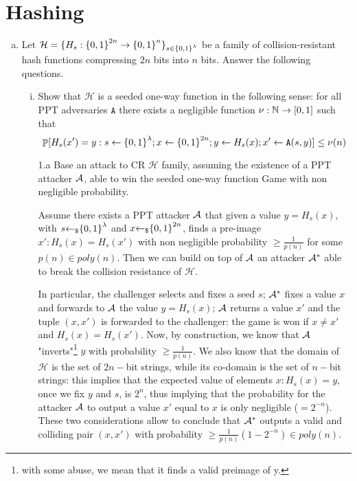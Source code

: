 \section{Hashing}
\begin{enumerate}[(a)]
	\item  Let $\mathcal{H} = \{H_s : {\{0, 1\}}^{2n} \to {\{0, 1\}}^n\}_{s\in{\{0, 1\}}^\lambda}$ be a family of collision-resistant hash
	functions compressing $2n$ bits into $n$ bits. Answer the following questions.
	\begin{enumerate}[(i)]
		\item Show that $\mathcal{H}$ is a seeded one-way function in the following sense: for all PPT adversaries $\texttt{A}$ there exists a negligible function $\nu: {\mathbb N} \to [0, 1]$ such that
		\[\mathop{\mathbb P}[H_s(x') = y: s \leftarrow {\{0, 1\}}^\lambda; x \leftarrow {\{0, 1\}}^{2n}; y \leftarrow H_s(x); x' \leftarrow \texttt{A}(s,y)] \le \nu(n) \]

	\begin{solution}
		\begin{cryptoredux}
			{1.a}
			{Base an attack to CR $\mathcal{H}$ family, assuming the existence of a PPT attacker $\mathcal{A}$, able to win the seeded one-way function Game with non negligible probability.}
			{}
			{}
			{}
			\cseqdelay
			\cseqdelay
		\end{cryptoredux}
	Assume there exists a PPT attacker $\mathcal{A}$ that given a value $y = H_s(x)$, with $s{\leftarrow_\$} {\{0, 1\}}^\lambda$ and $x{\leftarrow_\$}{\{0, 1\}}^{2n}$, finds a pre-image $x': H_s(x) = H_s(x')$ with non negligible probability $\ge \frac{1}{p(n)}$ for some $p(n) \in poly(n)$. Then we can build on top of $\mathcal{A}$ an attacker $\mathcal{A}^*$ able to break the collision resistance of $\mathcal{H}$.

	In particular, the challenger selects and fixes a seed $s$; $\mathcal{A}^*$ fixes a value $x$ and forwards to $\mathcal{A}$ the value $y = H_s(x)$; $\mathcal{A}$ returns a value $x'$ and the tuple $(x, x')$ is forwarded to the challenger: the game is won if $x \ne x'$ and $H_s(x) = H_s(x')$. Now, by construction, we know that $\mathcal{A}$ "inverts"\footnote{with some abuse, we mean that it finds a valid preimage of y.} $y$ with probability $\ge \frac{1}{p(n)}$. We also know that the domain of $\mathcal{H}$ is the set of $2n-$bit strings, while its co-domain is the set of $n-$bit strings: this implies that the expected value of elements $x: H_s(x) = y$, once we fix $y$ and $s$, is $2^n$, thus implying that the probability for the attacker $\mathcal{A}$ to output a value $x'$ equal to $x$ is only negligible ($= 2^{-n}$). These two considerations allow to conclude that $\mathcal{A}^*$ outputs a valid and colliding pair $(x, x')$ with probability $\ge \frac{1}{p(n)} (1 - 2^{-n}) \in poly(n)$.
	\end{solution}


\end{enumerate}
\end{enumerate}
